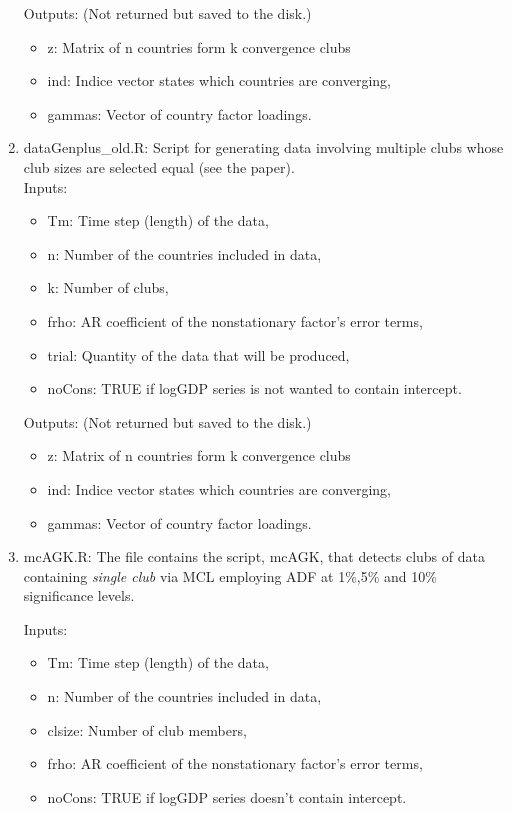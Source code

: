 \documentclass{article}
\begin{document}
\begin{enumerate}
	Outputs: (Not returned but saved to the disk.)
	
	\begin{itemize}
		\item  z: Matrix of n countries form k convergence clubs
		\item  ind: Indice vector states which countries are converging,
		\item  gammas:  Vector of country factor loadings.  
	\end{itemize}		 
	\item dataGenplus\_old.R: Script for generating data involving multiple clubs whose club sizes are selected equal (see the paper). \\

Inputs:
\begin{itemize}
	
	\item Tm: Time step (length) of the data,
	\item n: Number of the countries included in data,
	\item k: Number of clubs, 
	\item frho: AR coefficient of the nonstationary factor's error terms,
	\item trial: Quantity of the data that will be produced,
	\item noCons: TRUE if logGDP series is not wanted to contain intercept.
\end{itemize}

Outputs: (Not returned but saved to the disk.)

\begin{itemize}
	\item  z: Matrix of n countries form k convergence clubs
	\item  ind: Indice vector states which countries are converging,
	\item  gammas:  Vector of country factor loadings.  
\end{itemize}
		 
	\item mcAGK.R: The file contains the script, mcAGK, that detects clubs of data containing \textit{single club} via MCL employing ADF at 1\%,5\% and 10\% significance levels.
	
		Inputs:
		\begin{itemize}
			
			\item Tm: Time step (length) of the data,
			\item n: Number of the countries included in data,
			\item clsize: Number of club members, 
			\item frho: AR coefficient of the nonstationary factor's error terms,
			\item noCons: TRUE if logGDP series doesn't contain intercept.
		\end{itemize}
		

\end{enumerate}
\end{document}
